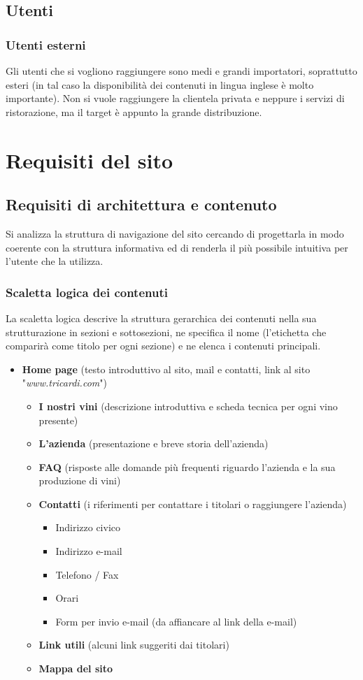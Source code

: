 \documentclass[a4paper]{report}	%
\begin{document}
\section{Utenti}
\subsection{Utenti esterni}
Gli utenti che si vogliono raggiungere sono medi e grandi importatori, soprattutto esteri (in tal caso la disponibilità dei contenuti in lingua inglese è molto importante). Non si vuole raggiungere la clientela privata e neppure i servizi di ristorazione, ma il target è appunto la grande distribuzione.

\chapter{Requisiti del sito}
\section{Requisiti di architettura e contenuto}
Si analizza la struttura di navigazione del sito cercando di progettarla in modo coerente con la struttura informativa ed di renderla il più possibile intuitiva per l'utente che la utilizza. 
\subsection{Scaletta logica dei contenuti}
La scaletta logica descrive la struttura gerarchica dei contenuti nella sua strutturazione in sezioni e sottosezioni, ne specifica il nome (l'etichetta che comparirà come titolo per ogni sezione) e ne elenca i contenuti principali.
\begin{itemize}
\item \textbf{Home page} (testo introduttivo al sito, mail e contatti, link al sito "\textsl{www.tricardi.com}")
  \begin{itemize}
  \item \textbf{I nostri vini} (descrizione introduttiva e scheda tecnica per ogni vino presente)
  \item \textbf{L'azienda} (presentazione e breve storia dell'azienda)
  \item \textbf{FAQ} (risposte alle domande più frequenti riguardo l'azienda e la sua produzione di vini)
  \item \textbf{Contatti} (i riferimenti per contattare i titolari o raggiungere l'azienda)
      \begin{itemize}
      \item Indirizzo civico
      \item Indirizzo e-mail
      \item Telefono / Fax
      \item Orari
      \item Form per invio e-mail (da affiancare al link della e-mail)
      \end{itemize}
  \item \textbf{Link utili} (alcuni link suggeriti dai titolari)
  \item \textbf{Mappa del sito} 
  \end{itemize}
\end{itemize} 
\end{document}

